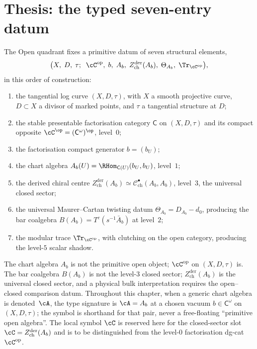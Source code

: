 \section{Thesis: the typed seven-entry datum}
\label{sec:hdm-thesis}

\begin{convention}
\label{conv:hdm-primitive-datum}
The Open quadrant fixes a primitive datum of seven structural
elements,
\[
\bigl(X,\;D,\;\tau;\;\;\cC^{\mathrm{op}},\;b,\;A_b,\;
Z^{\mathrm{der}}_{\mathrm{ch}}(A_b),\;\Theta_{A_b},\;\Tr_{\cC^{\mathrm{op}}}\bigr),
\]
in this order of construction:
\begin{enumerate}[label=\textup{(\arabic*)}]
\item the tangential log curve $(X,D,\tau)$, with $X$ a smooth
projective curve, $D\subset X$ a divisor of marked points, and
$\tau$ a tangential structure at $D$;
\item the stable presentable factorisation category $\mathsf C$ on
$(X,D,\tau)$ and its compact opposite
$\cC^\op=(\mathsf C^\omega)^\op$, level~$0$;
\item the factorisation compact generator $b=(b_U)$;
\item the chart algebra
$A_b(U)=\RHom_{\mathsf C(U)}(b_U,b_U)$, level~$1$;
\item the derived chiral centre
$Z^{\mathrm{der}}_{\mathrm{ch}}(A_b) \simeq
\mathcal{C}^\bullet_{\mathrm{ch}}(A_b,A_b)$, level~$3$, the universal
closed sector;
\item the universal Maurer--Cartan twisting datum
$\Theta_{A_b}=D_{A_b}-d_0$, producing the bar coalgebra
$B(A_b)=T^c(s^{-1}\bar A_b)$ at level~$2$;
\item the modular trace $\Tr_{\cC^{\mathrm{op}}}$, with clutching on
the open category, producing the level-$5$ scalar shadow.
\end{enumerate}
The chart algebra $A_b$ is not the primitive open object;
$\cC^{\mathrm{op}}$ on $(X,D,\tau)$ is. The bar coalgebra $B(A_b)$
is not the level-$3$ closed sector;
$Z^{\mathrm{der}}_{\mathrm{ch}}(A_b)$ is the universal closed sector,
and a physical bulk interpretation requires the
open--closed comparison datum. Throughout
this chapter, when a generic chart algebra is denoted~$\cA$, the
type signature is $\cA = A_b$ at a chosen vacuum
$b\in\mathsf C^\omega$ on $(X,D,\tau)$; the symbol is shorthand for
that pair, never a free-floating ``primitive open algebra''. The
local symbol $\cC$ is reserved here for the closed-sector slot
$\cC = Z^{\mathrm{der}}_{\mathrm{ch}}(A_b)$ and is to be distinguished
from the level-$0$ factorisation dg-cat $\cC^{\mathrm{op}}$.
\end{convention}

